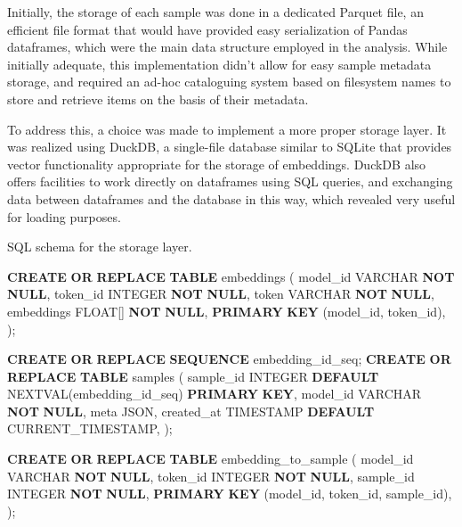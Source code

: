 \documentclass[
  a4paper, twoside, 10pt, titlepage]{book}
\newenvironment{Shaded}{}{}
\newcommand{\DataTypeTok}[1]{\textcolor[rgb]{0.56,0.13,0.00}{#1}}
\newcommand{\FunctionTok}[1]{\textcolor[rgb]{0.02,0.16,0.49}{#1}}
\newcommand{\KeywordTok}[1]{\textcolor[rgb]{0.00,0.44,0.13}{\textbf{#1}}}
\newcommand{\NormalTok}[1]{#1}
\newcommand{\StringTok}[1]{\textcolor[rgb]{0.25,0.44,0.63}{#1}}
\begin{document}
Initially, the storage of each sample was done in a dedicated Parquet
file, an efficient file format that would have provided easy
serialization of Pandas dataframes, which were the main data structure
employed in the analysis. While initially adequate, this implementation
didn't allow for easy sample metadata storage, and required an ad-hoc
cataloguing system based on filesystem names to store and retrieve items
on the basis of their metadata.

To address this, a choice was made to implement a more proper storage
layer. It was realized using DuckDB, a single-file database similar to
SQLite that provides vector functionality appropriate for the storage of
embeddings. DuckDB also offers facilities to work directly on dataframes
using SQL queries, and exchanging data between dataframes and the
database in this way, which revealed very useful for loading purposes.

\begin{codelisting}

\caption{SQL schema for the storage layer.}\label{lst:sqlschema}

\begin{Shaded}
\begin{Highlighting}[]
\KeywordTok{CREATE} \KeywordTok{OR} \KeywordTok{REPLACE} \KeywordTok{TABLE}\NormalTok{ embeddings (}
\NormalTok{    model\_id }\DataTypeTok{VARCHAR} \KeywordTok{NOT} \KeywordTok{NULL}\NormalTok{,}
\NormalTok{    token\_id }\DataTypeTok{INTEGER} \KeywordTok{NOT} \KeywordTok{NULL}\NormalTok{,}
\NormalTok{    token }\DataTypeTok{VARCHAR} \KeywordTok{NOT} \KeywordTok{NULL}\NormalTok{,}
\NormalTok{    embeddings }\DataTypeTok{FLOAT}\NormalTok{[] }\KeywordTok{NOT} \KeywordTok{NULL}\NormalTok{,}
    \KeywordTok{PRIMARY} \KeywordTok{KEY}\NormalTok{ (model\_id, token\_id),}
\NormalTok{);}

\KeywordTok{CREATE} \KeywordTok{OR} \KeywordTok{REPLACE} \KeywordTok{SEQUENCE}\NormalTok{ embedding\_id\_seq;}
\KeywordTok{CREATE} \KeywordTok{OR} \KeywordTok{REPLACE} \KeywordTok{TABLE}\NormalTok{ samples (}
\NormalTok{    sample\_id }\DataTypeTok{INTEGER} \KeywordTok{DEFAULT}\NormalTok{ NEXTVAL(}\StringTok{\textquotesingle{}embedding\_id\_seq\textquotesingle{}}\NormalTok{) }\KeywordTok{PRIMARY} \KeywordTok{KEY}\NormalTok{,}
\NormalTok{    model\_id }\DataTypeTok{VARCHAR} \KeywordTok{NOT} \KeywordTok{NULL}\NormalTok{,}
\NormalTok{    meta JSON,}
\NormalTok{    created\_at }\DataTypeTok{TIMESTAMP} \KeywordTok{DEFAULT} \FunctionTok{CURRENT\_TIMESTAMP}\NormalTok{,}
\NormalTok{);}

\KeywordTok{CREATE} \KeywordTok{OR} \KeywordTok{REPLACE} \KeywordTok{TABLE}\NormalTok{ embedding\_to\_sample (}
\NormalTok{    model\_id }\DataTypeTok{VARCHAR} \KeywordTok{NOT} \KeywordTok{NULL}\NormalTok{,}
\NormalTok{    token\_id }\DataTypeTok{INTEGER} \KeywordTok{NOT} \KeywordTok{NULL}\NormalTok{,}
\NormalTok{    sample\_id }\DataTypeTok{INTEGER} \KeywordTok{NOT} \KeywordTok{NULL}\NormalTok{,}
    \KeywordTok{PRIMARY} \KeywordTok{KEY}\NormalTok{ (model\_id, token\_id, sample\_id),}
\NormalTok{);}
\end{Highlighting}
\end{Shaded}

\end{codelisting}
\end{document}
